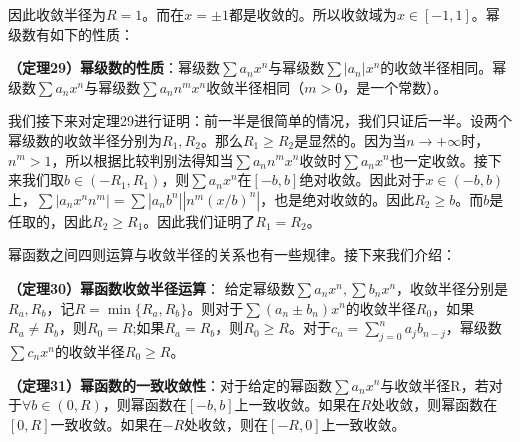 \documentclass{ctexart}
\let\oldtextbf\textbf
\renewcommand{\textbf}[1]{\textcolor{brown!50!red}{\oldtextbf{#1}}}
\begin{document}
因此收敛半径为$R=1$。而在$x=\pm 1$都是收敛的。所以收敛域为$x\in [-1,1]$。幂级数有如下的性质：

\begin{tcolorbox}[
    colback=bac2,     %
    colframe=fra2,   %
    coltitle=white,             %
    coltext=tex2,
    title=圆角框,
    fonttitle=\bfseries,        %
arc=3mm,                     %
breakable
]

\textbf{\color{brown!50!red}（定理29）幂级数的性质}：幂级数$\sum a_nx^n$与幂级数$\sum |a_n|x^n$的收敛半径相同。幂级数$\sum a_nx^n$与幂级数$\sum a_n n^mx^n$收敛半径相同（$m>0$，是一个常数）。
\end{tcolorbox}

我们接下来对定理29进行证明：前一半是很简单的情况，我们只证后一半。设两个幂级数的收敛半径分别为$R_1,R_2$。那么$R_1\geq R_2$是显然的。因为当$n\to +\infty$时，$n^m>1$，所以根据比较判别法得知当$\sum a_nn^mx^n$收敛时$\sum a_nx^n$也一定收敛。接下来我们取$b\in(-R_1,R_1)$，则$\sum a_nx^n$在$[-b,b]$绝对收敛。因此对于$x\in(-b,b)$上，$\sum |a_nx^nn^m|=\sum|a_n b^n||n^m(x/b)^n|$，也是绝对收敛的。因此$R_2\geq b$。而$b$是任取的，因此$R_2\geq R_1$。因此我们证明了$R_1=R_2$。

幂函数之间四则运算与收敛半径的关系也有一些规律。接下来我们介绍：
\begin{tcolorbox}[
    colback=bac2,     %
    colframe=fra2,   %
    coltitle=white,             %
    coltext=tex2,
    title=幂函数收敛半径运算,
    fonttitle=\bfseries,        %
arc=3mm,                     %
breakable
]
\textbf{\color{brown!50!red}（定理30）幂函数收敛半径运算}： 给定幂级数$\sum a_nx^n,\sum b_nx^n$，收敛半径分别是$R_a,R_b$，记$R=\min\{R_a,R_b\}$。则对于$\sum (a_n\pm b_n)x^n$的收敛半径$R_0$，如果$R_a\neq R_b$，则$R_0=R$;如果$R_a=R_b$，则$R_0\geq R$。对于$c_n=\sum_{j=0}^{n}a_jb_{n-j}$，幂级数$\sum c_nx^n$的收敛半径$R_0\geq R$。
\end{tcolorbox}

\begin{tcolorbox}[
    colback=bac2,     %
    colframe=fra2,   %
    coltitle=white,             %
    coltext=tex2,
    title=幂函数一致收敛性,
    fonttitle=\bfseries,        %
arc=3mm,                     %
breakable
]
\textbf{\color{brown!50!red}（定理31）幂函数的一致收敛性}：对于给定的幂函数$\sum a_nx^n$与收敛半径R，若对于$\forall b\in(0,R)$，则幂函数在$[-b,b]$上一致收敛。如果在$R$处收敛，则幂函数在$[0,R]$一致收敛。如果在$-R$处收敛，则在$[-R,0]$上一致收敛。
\end{tcolorbox}
\end{document}
